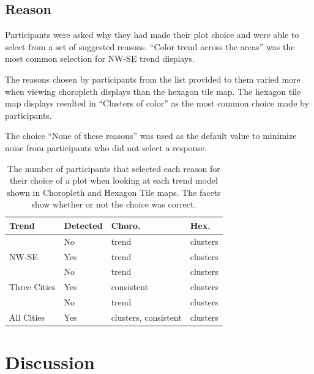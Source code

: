\documentclass[journal]{vgtc}                     %
\begin{document}
\hypertarget{reason}{%
\subsection{Reason}\label{reason}}

Participants were asked why they had made their plot choice and were able to select from a set of suggested reasons.
``Color trend across the areas'' was the most common selection for NW-SE trend displays.

The reasons chosen by participants from the list provided to them varied more when viewing choropleth displays than the hexagon tile map.
The hexagon tile map displays resulted in ``Clusters of color'' as the most common choice made by participants.

The choice ``None of these reasons'' was used as the default value to minimize noise from participants who did not select a response.

\begin{table}

\caption{\label{tab:reason}The number of participants that selected each reason for their choice of a plot when looking at each trend model shown in Choropleth and Hexagon Tile maps. The facets show whether or not the choice was correct.}
\centering
\begin{tabular}[t]{llll}
\toprule
Trend & Detected & Choro. & Hex.\\
\midrule
 & No & trend & clusters\\
\cmidrule{2-4}
\multirow{-2}{*}{\raggedright NW-SE} & Yes & trend & clusters\\
\cmidrule{1-4}
 & No & trend & clusters\\
\cmidrule{2-4}
\multirow{-2}{*}{\raggedright Three Cities} & Yes & consistent & clusters\\
\cmidrule{1-4}
 & No & trend & clusters\\
\cmidrule{2-4}
\multirow{-2}{*}{\raggedright All Cities} & Yes & clusters, consistent & clusters\\
\bottomrule
\end{tabular}
\end{table}

\hypertarget{discussion}{%
\section{Discussion}\label{discussion}}
\end{document}
